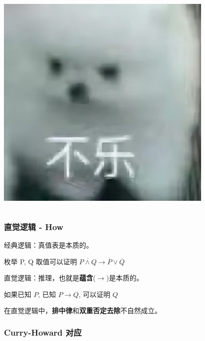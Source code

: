 \documentclass[UTF-8]{ctexbeamer}
\begin{document}
\begin{frame}
\begin{columns}
\begin{column}{0.5\textwidth}
      \includegraphics[width=0.8\textwidth]{assets/bule.png}
    \end{column}
  \end{columns}
\end{frame}

\begin{frame}
  \frametitle{直觉逻辑 - How}

  经典逻辑：真值表是本质的。

  \begin{center}
  枚举 P, Q 取值可以证明 $ \overline{P \land Q} \rightarrow \overline{P} \lor \overline{Q} $
  \end{center}

  \pause

  直觉逻辑：推理，也就是\textbf{蕴含}($\rightarrow$)是本质的。

  \begin{center}
    如果已知 $P$, 已知 $P \rightarrow Q$, 可以证明 $Q$
  \end{center}

  \pause
  \vspace{1em}

  \begin{center}
    在直觉逻辑中，\textbf{排中律}和\textbf{双重否定去除}不自然成立。
  \end{center}
\end{frame}

\begin{frame}
  \frametitle{Curry-Howard 对应}
\end{frame}
\end{document}
